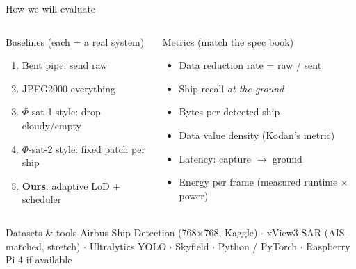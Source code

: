 \documentclass[aspectratio=169,10pt]{beamer}
\newcommand{\phisat}[1]{$\Phi$-sat-#1}
\begin{document}
\begin{frame}{How we will evaluate}
\begin{columns}[T]
\begin{block}{Baselines (each = a real system)}
\footnotesize
\begin{enumerate}
  \item Bent pipe: send raw
  \item JPEG2000 everything
  \item \phisat{1} style: drop cloudy/empty
  \item \phisat{2} style: fixed patch per ship
  \item \textbf{Ours}: adaptive LoD + scheduler
\end{enumerate}
\end{block}
\begin{block}{Metrics (match the spec book)}
\footnotesize
\begin{itemize}
  \item Data reduction rate = raw / sent
  \item Ship recall \emph{at the ground}
  \item Bytes per detected ship
  \item Data value density (Kodan's metric)
  \item Latency: capture $\rightarrow$ ground
  \item Energy per frame (measured runtime $\times$ power)
\end{itemize}
\end{block}
\end{columns}
\vspace{2mm}
\begin{exampleblock}{Datasets \& tools}
\footnotesize Airbus Ship Detection (768$\times$768, Kaggle) $\cdot$ xView3-SAR (AIS-matched, stretch) $\cdot$ Ultralytics YOLO $\cdot$ Skyfield $\cdot$ Python / PyTorch $\cdot$ Raspberry Pi 4 if available
\end{exampleblock}
\end{frame}
\end{document}
